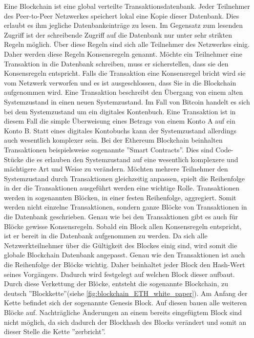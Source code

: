 Eine Blockchain ist eine global verteilte Transaktionsdatenbank. Jeder Teilnehmer des Peer-to-Peer Netzwerkes speichert lokal eine Kopie dieser Datenbank. Dies erlaubt es ihm jegliche Datenbankeinträge zu lesen.
Im Gegensatz zum lesenden Zugriff ist der schreibende Zugriff auf die Datenbank nur unter sehr strikten Regeln möglich. Über diese Regeln sind sich alle Teilnehmer des Netzwerkes einig. Daher werden diese Regeln Konsensregeln genannt. Möchte ein Teilnehmer eine Transaktion in die Datenbank schreiben, muss er sicherstellen, dass sie den Konsensregeln entspricht. Falls die Transaktion eine Konsensregel bricht wird sie vom Netzwerk verworfen und es ist ausgeschlossen, dass Sie in die Blockchain aufgenommen wird. Eine Transaktion beschreibt den Übergang von einem alten Systemzustand in einen neuen Systemzustand.
Im Fall von Bitcoin handelt es sich bei dem Systemzustand um ein digitales Kontenbuch. Eine Transaktion ist in diesem Fall die simple Überweisung eines Betrags von einem Konto A auf ein Konto B. 
Statt eines digitales Kontobuchs kann der Systemzustand allerdings auch wesentlich komplexer sein. Bei der Ethereum Blockchain beinhalten Transaktionen beispielsweise sogenannte ''Smart Contracts''. Dies sind Code-Stücke die es erlauben den Systemzustand auf eine wesentlich komplexere und mächtigere Art und Weise zu verändern.
Möchten mehrere Teilnehmer den Systemzustand durch Transaktionen gleichzeitig anpassen, spielt die Reihenfolge in der die Transaktionen ausgeführt werden eine wichtige Rolle.
Transaktionen werden in sogenannten Blöcken, in einer festen Reihenfolge, aggregiert. Somit werden nicht einzelne Transaktionen, sondern ganze Blöcke von Transaktionen in die Datenbank geschrieben.
Genau wie bei den Transaktionen gibt es auch für Blöcke gewisse Konsensregeln. Sobald ein Block allen Konsensregeln entspricht, ist er bereit in die Datenbank aufgenommen zu werden.
Da sich alle Netzwerkteilnehmer über die Gültigkeit des Blockes einig sind, wird somit die globale Blockchain Datenbank angepasst.
Genau wie den Transaktionen ist auch die Reihenfolge der Blöcke wichtig. Daher beinhaltet jeder Block den Hash-Wert seines Vorgängers. Dadurch wird festgelegt auf welchen Block dieser aufbaut.
Durch diese Verkettung der Blöcke, entsteht die sogenannte Blockchain, zu deutsch ''Blockkette''(siehe \ref{fig:blockchain_ETH_white_paper}).
Am Anfang der Kette befindet sich der sogenannte Genesis Block. Auf diesen bauen alle weiteren Blöcke auf.
Nachträgliche Änderungen an einem bereits eingefügtem Block sind nicht möglich, da sich dadurch der Blockhash des Blocks verändert und somit an dieser Stelle die Kette ''zerbricht''.

